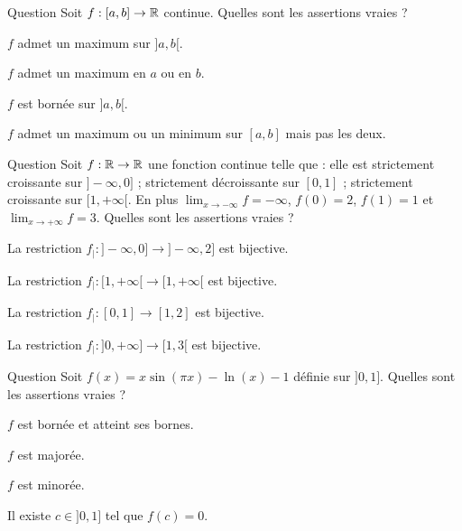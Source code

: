 \begin{multi}{Question}
Soit \(f : [a,b] \to \mathbb{R}\) continue. Quelles sont les assertions vraies ?

    \item \(f\) admet un maximum sur \(]a,b[\).
    \item \(f\) admet un maximum en \(a\) ou en \(b\).
    \item* \(f\) est bornée sur \(]a,b[\).
    \item \(f\) admet un maximum ou un minimum sur \([a,b]\) mais pas les deux.
\end{multi}


\begin{multi}[multiple,feedback=
{Le plus simple est de dessiner l'allure du graphe (ou le tableau de variation) pour se convaincre que \(f\) restreinte à \(]-\infty,0]\) définit une bijection vers \(]-\infty,2]\) ;  \(f\) restreinte à \([0,1]\) définit une bijection (décroissante) vers \([1,2]\) ;  \(f\) restreinte à \([1,+\infty[\) définit une bijection vers \([1,3[\). 
}]{Question}
Soit \(f : \mathbb{R} \to \mathbb{R}\) une fonction continue telle que : elle est strictement croissante sur \(]-\infty,0]\) ; strictement décroissante sur \([0,1]\) ; strictement croissante sur \([1,+\infty[\). En plus \(\lim_{x\to-\infty} f = - \infty\), \(f(0)=2\), \(f(1) = 1\) et \(\lim_{x\to+\infty} f = 3\). Quelles sont les assertions vraies ?

    \item* La restriction \(f_| : ]-\infty,0] \to ]-\infty,2]\) est bijective.
    \item La restriction \(f_| : [1,+\infty[ \to [1,+\infty[\) est bijective.
    \item* La restriction \(f_| : [0,1] \to [1,2]\) est bijective.
    \item La restriction \(f_| : ]0,+\infty] \to [1,3[\) est bijective.
\end{multi}


\begin{multi}[multiple,feedback=
{Attention l'intervalle de définition n'est pas fermé borné. Par contre la limite de \(f\) en \(0\) en \(+\infty\) et \(f(1) = -1\). On en déduit que \(f\) n'est pas majorée, par contre elle est minorée, et par la théorème des valeurs intermédiaires, elle s'annule.
}]{Question}
Soit \(f(x) = x \sin(\pi x) - \ln(x) - 1\) définie sur \(]0,1]\).
Quelles sont les assertions vraies ?

    \item \(f\) est bornée et atteint ses bornes.
    \item \(f\) est majorée.
    \item* \(f\) est minorée.
    \item* Il existe \(c \in ]0,1]\) tel que \(f(c)=0\).
\end{multi}


